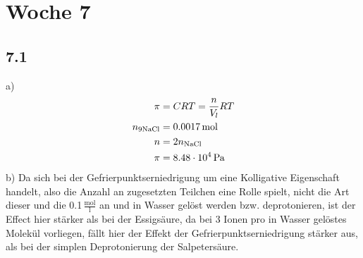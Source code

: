 \documentclass{article}
\begin{document}
\section*{Woche 7}
\subsection*{7.1}
a)
\begin{align*}
    \pi &= CRT = \frac{n}{V_l}RT\\
    n_{9\ce{NaCl}} &= 0.0017\,\mathrm{mol}\\
    n &= 2n_{\ce{NaCl}}\\
    \pi &= 8.48\cdot 10^4 \,\mathrm{Pa}
\end{align*}
b)
Da sich bei der Gefrierpunktserniedrigung um eine Kolligative Eigenschaft handelt, also die Anzahl an zugesetzten Teilchen eine Rolle spielt, nicht die Art dieser und die 0.1$\,\mathrm{\frac{mol}{l}}$ an  und  in Wasser gelöst werden bzw. deprotonieren, ist der Effect hier stärker als bei der Essigsäure, da bei  3 Ionen pro in Wasser gelöstes Molekül vorliegen, fällt hier der Effekt der Gefrierpunktserniedrigung stärker aus, als bei der simplen Deprotonierung der Salpetersäure.\\
\end{document}
